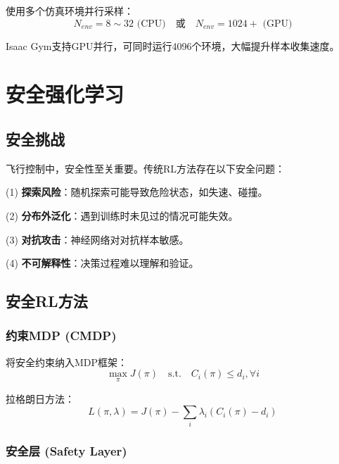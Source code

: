 \documentclass[12pt,a4paper]{ctexart}
\begin{document}
使用多个仿真环境并行采样：
\begin{equation}
N_{env} = 8 \sim 32 \text{ (CPU)} \quad \text{或} \quad N_{env} = 1024+ \text{ (GPU)}
\end{equation}

Isaac Gym支持GPU并行，可同时运行4096个环境，大幅提升样本收集速度。

\section{安全强化学习}\label{sec:safe_rl}

\subsection{安全挑战}

飞行控制中，安全性至关重要。传统RL方法存在以下安全问题：

(1) \textbf{探索风险}：随机探索可能导致危险状态，如失速、碰撞。

(2) \textbf{分布外泛化}：遇到训练时未见过的情况可能失效。

(3) \textbf{对抗攻击}：神经网络对对抗样本敏感。

(4) \textbf{不可解释性}：决策过程难以理解和验证。

\subsection{安全RL方法}

\subsubsection{约束MDP (CMDP)}

将安全约束纳入MDP框架：
\begin{equation}
\max_\pi J(\pi) \quad \text{s.t.} \quad C_i(\pi) \leq d_i, \forall i
\end{equation}

拉格朗日方法：
\begin{equation}
L(\pi, \lambda) = J(\pi) - \sum_i \lambda_i (C_i(\pi) - d_i)
\end{equation}

\subsubsection{安全层 (Safety Layer)}
\end{document}
